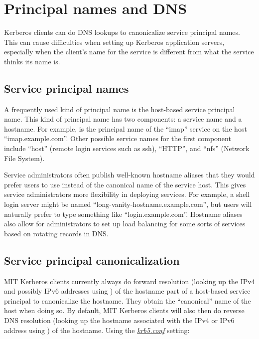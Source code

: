 \documentclass[letterpaper,10pt,english]{sphinxmanual}
\begin{document}
\chapter{Principal names and DNS}
\label{admin/princ_dns:principal-names-and-dns}\label{admin/princ_dns::doc}
Kerberos clients can do DNS lookups to canonicalize service principal
names.  This can cause difficulties when setting up Kerberos
application servers, especially when the client's name for the service
is different from what the service thinks its name is.


\section{Service principal names}
\label{admin/princ_dns:service-principal-names}
A frequently used kind of principal name is the host-based service
principal name.  This kind of principal name has two components: a
service name and a hostname.  For example, 
is the principal name of the ``imap'' service on the host
``imap.example.com''.  Other possible service names for the first
component include ``host'' (remote login services such as ssh), ``HTTP'',
and ``nfs'' (Network File System).

Service administrators often publish well-known hostname aliases that
they would prefer users to use instead of the canonical name of the
service host.  This gives service administrators more flexibility in
deploying services.  For example, a shell login server might be named
``long-vanity-hostname.example.com'', but users will naturally prefer to
type something like ``login.example.com''.  Hostname aliases also allow
for administrators to set up load balancing for some sorts of services
based on rotating  records in DNS.


\section{Service principal canonicalization}
\label{admin/princ_dns:service-principal-canonicalization}
MIT Kerberos clients currently always do forward resolution (looking
up the IPv4 and possibly IPv6 addresses using ) of
the hostname part of a host-based service principal to canonicalize
the hostname.  They obtain the ``canonical'' name of the host when doing
so.  By default, MIT Kerberos clients will also then do reverse DNS
resolution (looking up the hostname associated with the IPv4 or IPv6
address using ) of the hostname.  Using the
{\hyperref[admin/conf_files/krb5_conf:krb5-conf-5]{\emph{krb5.conf}}} setting:
\end{document}
